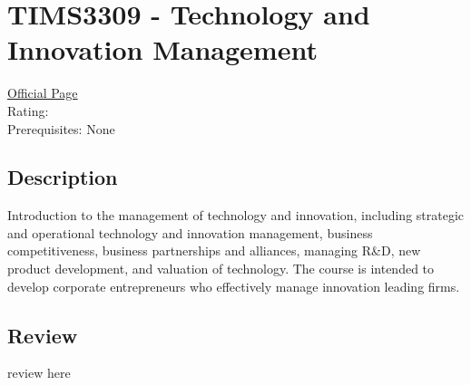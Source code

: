 \hypertarget{TIMS3309}{\section{TIMS3309 - Technology and Innovation Management}}

\large
\textcolor{turbo_purple}{\href{https://my.uq.edu.au/programs-courses/course.html?course_code=TIMS3309}{Official Page}} \\
Rating: \cstar\cstar\cstar\cstar\ostar \\
Prerequisites: None

\normalsize
\subsection*{Description}
Introduction to the management of technology and innovation, including strategic and operational technology and innovation management, business competitiveness, business partnerships and alliances, managing R\&D, new product development, and valuation of technology.
The course is intended to develop corporate entrepreneurs who effectively manage innovation leading firms.

\subsection*{Review}
review here
